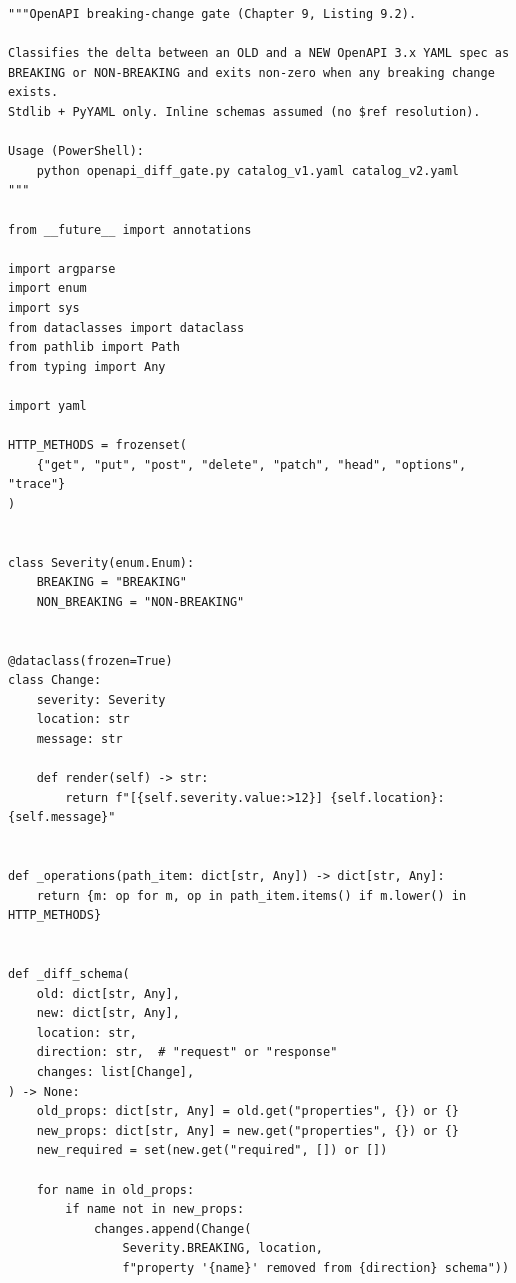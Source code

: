 \begin{verbatim}
"""OpenAPI breaking-change gate (Chapter 9, Listing 9.2).

Classifies the delta between an OLD and a NEW OpenAPI 3.x YAML spec as
BREAKING or NON-BREAKING and exits non-zero when any breaking change exists.
Stdlib + PyYAML only. Inline schemas assumed (no $ref resolution).

Usage (PowerShell):
    python openapi_diff_gate.py catalog_v1.yaml catalog_v2.yaml
"""

from __future__ import annotations

import argparse
import enum
import sys
from dataclasses import dataclass
from pathlib import Path
from typing import Any

import yaml

HTTP_METHODS = frozenset(
    {"get", "put", "post", "delete", "patch", "head", "options", "trace"}
)


class Severity(enum.Enum):
    BREAKING = "BREAKING"
    NON_BREAKING = "NON-BREAKING"


@dataclass(frozen=True)
class Change:
    severity: Severity
    location: str
    message: str

    def render(self) -> str:
        return f"[{self.severity.value:>12}] {self.location}: {self.message}"


def _operations(path_item: dict[str, Any]) -> dict[str, Any]:
    return {m: op for m, op in path_item.items() if m.lower() in HTTP_METHODS}


def _diff_schema(
    old: dict[str, Any],
    new: dict[str, Any],
    location: str,
    direction: str,  # "request" or "response"
    changes: list[Change],
) -> None:
    old_props: dict[str, Any] = old.get("properties", {}) or {}
    new_props: dict[str, Any] = new.get("properties", {}) or {}
    new_required = set(new.get("required", []) or [])

    for name in old_props:
        if name not in new_props:
            changes.append(Change(
                Severity.BREAKING, location,
                f"property '{name}' removed from {direction} schema"))


\end{verbatim}
